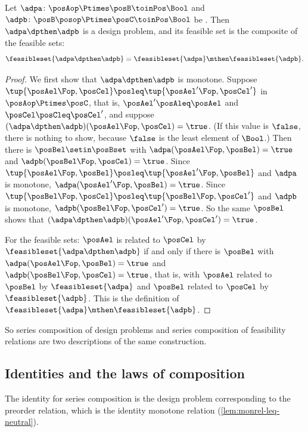 \begin{lemma}
    \label{lem:dp-series-composition}
    Let $\adpa \colon \posAop \Ptimes \posB \toinPos \Bool$ and $\adpb \colon \posB\posop \Ptimes \posC \toinPos \Bool$ be .
    Then $\adpa \dpthen \adpb$ is a design problem, and its feasible set is the composite of the feasible sets:
    \begin{equation}
        \feasibleset{\adpa \dpthen \adpb} = \feasibleset{\adpa} \mthen \feasibleset{\adpb}.
    \end{equation}
\end{lemma}
\begin{proof}
    We first show that $\adpa \dpthen \adpb$ is monotone.
    Suppose $\tup{\posAel\Fop, \posCel} \posleq \tup{{\posAel'}\Fop, \posCel'}$ in $\posAop \Ptimes \posC$, that is, $\posAel' \posAleq \posAel$ and $\posCel \posCleq \posCel'$, and suppose $(\adpa \dpthen \adpb)(\posAel\Fop, \posCel) = \true$.
    (If this value is $\false$, there is nothing to show, because $\false$ is the least element of $\Bool$.)
    Then there is $\posBel \setin \posBset$ with $\adpa(\posAel\Fop, \posBel) = \true$ and $\adpb(\posBel\Fop, \posCel) = \true$.
    Since $\tup{\posAel\Fop, \posBel} \posleq \tup{{\posAel'}\Fop, \posBel}$ and $\adpa$ is monotone, $\adpa({\posAel'}\Fop, \posBel) = \true$.
    Since $\tup{\posBel\Fop, \posCel} \posleq \tup{\posBel\Fop, \posCel'}$ and $\adpb$ is monotone, $\adpb(\posBel\Fop, \posCel') = \true$.
    So the same $\posBel$ shows that $(\adpa \dpthen \adpb)({\posAel'}\Fop, \posCel') = \true$.

    For the feasible sets: $\posAel$ is related to $\posCel$ by $\feasibleset{\adpa \dpthen \adpb}$ if and only if there is $\posBel$ with $\adpa(\posAel\Fop, \posBel) = \true$ and $\adpb(\posBel\Fop, \posCel) = \true$, that is, with $\posAel$ related to $\posBel$ by $\feasibleset{\adpa}$ and $\posBel$ related to $\posCel$ by $\feasibleset{\adpb}$.
    This is the definition of $\feasibleset{\adpa} \mthen \feasibleset{\adpb}$.
\end{proof}

So series composition of design problems and series composition of feasibility relations are two descriptions of the same construction.

\subsection{Identities and the laws of composition}

The identity for series composition is the design problem corresponding to the preorder relation, which is the identity monotone relation (\cref{lem:monrel-leq-neutral}).

